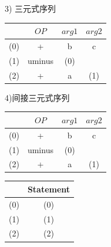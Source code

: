 \documentclass[a4paper, 16pt]{article}
\begin{document}
3) 三元式序列
\begin{table}[H]
\centering
\begin{tabular}{c|c|c|c}
\hline
\hline
 &$OP$& $arg1$ & $arg2$ \\
\hline
(0) & + & b & c \\
(1) & uminus & (0)& \\
(2) & + & a & (1) \\
\hline
\end{tabular}
\end{table}
4)间接三元式序列
\begin{table}[H]
\centering
\begin{tabular}{c|c|c|c}
\hline
\hline
 &$OP$& $arg1$ & $arg2$ \\
\hline
(0) & + & b & c \\
(1) & uminus & (0)& \\
(2) & + & a & (1) \\
\hline
\end{tabular}
\end{table}

\begin{table}[H]
\centering
\begin{tabular}{c|c}
\hline
\hline
 &Statement \\
\hline
(0) & (0) \\
(1) & (1) \\
(2) & (2) \\
\hline
\end{tabular}
\end{table}
\end{document}
